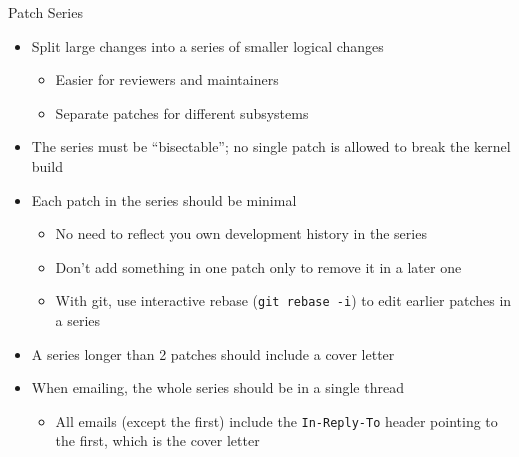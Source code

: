 \documentclass{beamer}
\begin{document}
\begin{frame}{Patch Series}
  \begin{itemize}
  \item Split large changes into a series of smaller logical changes
    \begin{itemize}
    \item Easier for reviewers and maintainers
    \item Separate patches for different subsystems
    \end{itemize}
  \item The series must be ``bisectable''; no single patch is allowed
    to break the kernel build
  \item Each patch in the series should be minimal
    \begin{itemize}
    \item No need to reflect you own development history in the series
    \item Don't add something in one patch only to remove it in a
      later one
    \item With git, use interactive rebase (\texttt{git rebase -i}) to
      edit earlier patches in a series
    \end{itemize}
  \item A series longer than 2 patches should include a cover letter
  \item When emailing, the whole series should be in a single thread
    \begin{itemize}
    \item All emails (except the first) include the
      \texttt{In-Reply-To} header pointing to the first, which is the
      cover letter
    \end{itemize}
  \end{itemize}
\end{frame}
\end{document}
